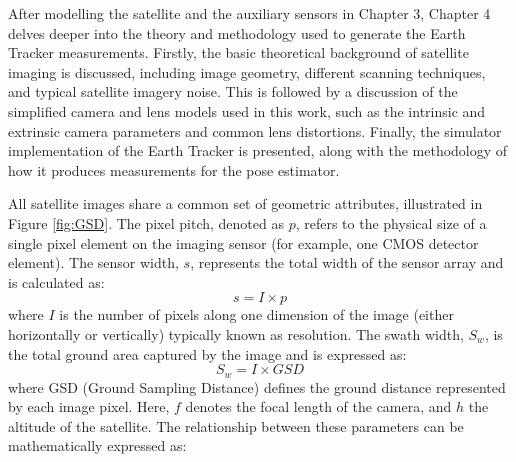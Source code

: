\label{chap:imgpros}

\label{sec:imgintro}

After modelling the satellite and the auxiliary sensors in Chapter 3, Chapter 4 delves deeper into the theory and methodology used to generate the Earth Tracker measurements.
Firstly, the basic theoretical background of satellite imaging is discussed, including image geometry, different scanning techniques, and typical satellite imagery noise.
This is followed by a discussion of the simplified camera and lens models used in this work, such as the intrinsic and extrinsic camera parameters and common lens distortions.
Finally, the simulator implementation of the Earth Tracker is presented, along with the methodology of how it produces measurements for the pose estimator.

\label{sec:satImgChar}

\label{subsec: ImgGeo}

\noindent
All satellite images share a common set of geometric attributes, illustrated in Figure \ref{fig:GSD}. 
The pixel pitch, denoted as $p$, refers to the physical size of a single pixel element on the imaging sensor (for example, one CMOS detector element). 
The sensor width, $s$, represents the total width of the sensor array and is calculated as:
\[
s = I \times p
\]
where $I$ is the number of pixels along one dimension of the image (either horizontally or vertically) typically known as resolution. The swath width, $S_w$, is the total ground area captured by the image and is expressed as:
\[
S_w = I \times GSD
\]
where GSD (Ground Sampling Distance) defines the ground distance represented by each image pixel. Here, $f$ denotes the focal length of the camera, and $h$ the altitude of the satellite. 
The relationship between these parameters can be mathematically expressed as:


